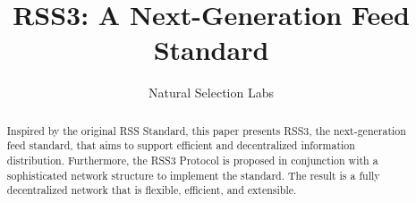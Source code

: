 \documentclass[conference]{IEEEtran}
\begin{document}
\title{RSS3: A Next-Generation Feed Standard}

%
\author{Natural Selection Labs}
\maketitle              %

\thispagestyle{plain}
\pagestyle{plain}

\begin{abstract}

Inspired by the original RSS Standard, this paper presents RSS3, the next-generation feed standard, that aims to support efficient and decentralized information distribution. Furthermore, the RSS3 Protocol is proposed in conjunction with a sophisticated network structure to implement the standard. The result is a fully decentralized network that is flexible, efficient, and extensible.

\end{abstract}

















\let\section=\origsection


\end{document}
